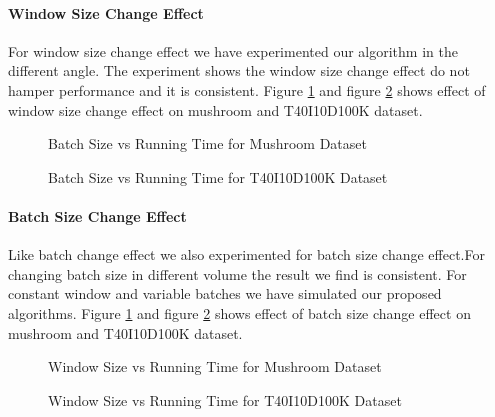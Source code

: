     \paragraph{Window Size Change Effect}For window size change effect we have experimented our algorithm in the different angle. The experiment shows the window size change effect do not hamper performance and it is consistent. Figure \ref{result:g_m_const_batch} and figure \ref{result:g_t10_const_batch} shows effect of window size change effect on mushroom and T40I10D100K dataset.
        \begin{figure}[h]
        \centering
            
        \caption{Batch Size vs Running Time for Mushroom Dataset }
        \label{result:g_m_const_batch}
        \end{figure}
        \begin{figure}[h]
        \centering
            
        \caption{Batch Size vs Running Time for T40I10D100K Dataset }
        \label{result:g_t10_const_batch}
        \end{figure}
    \paragraph{Batch Size Change Effect}Like batch change effect we also experimented for batch size change effect.For changing batch size in different volume the result we find is consistent. For constant window and variable batches we have simulated our proposed algorithms. Figure \ref{result:g_m_const_batch} and figure \ref{result:g_t10_const_batch} shows effect of batch size change effect on mushroom and T40I10D100K dataset.
        \begin{figure}[h]
        \centering
            
        \caption{Window Size vs Running Time for Mushroom Dataset }
        \label{result:g_m_const_win}
        \end{figure}
        \begin{figure}[h]
        \centering
            
        \caption{Window Size vs Running Time for T40I10D100K Dataset }
        \label{result:g_t10_const_win}
        \end{figure}
\clearpage
